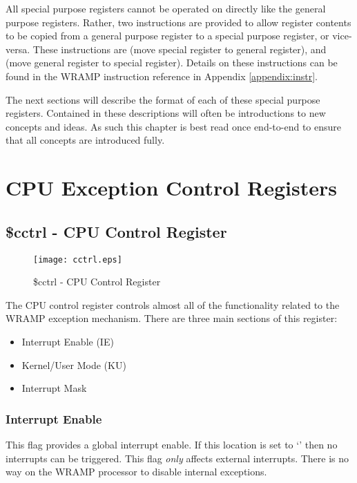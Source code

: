 All special purpose registers cannot be operated on directly like
the general purpose registers. Rather, two instructions are provided
to allow register contents to be copied from a general purpose
register to a special purpose register, or vice-versa. These
instructions are  (move special register to general
register), and  (move general register to special
register). Details on these instructions can be found in the WRAMP
instruction reference in Appendix \ref{appendix:instr}.

The next sections will describe the format of each of these special
purpose registers. Contained in these descriptions will often be
introductions to new concepts and ideas. As such this chapter is best
read once end-to-end to ensure that all concepts are introduced fully.

\section{CPU Exception Control Registers}

\subsection{\$cctrl - CPU Control Register}

\begin{figure}[h]
\begin{center}
\texttt{[image: cctrl.eps]}
\caption{\$cctrl - CPU Control Register}
\label{cctrl_pic}
\end{center}
\end{figure}

The CPU control register controls almost all of the functionality
related to the WRAMP exception mechanism. There are three main
sections of this register:

\begin{itemize}
\item Interrupt Enable (IE)
\item Kernel/User Mode (KU)
\item Interrupt Mask
\end{itemize}

\subsubsection{Interrupt Enable}

This flag provides a global interrupt enable. If this location is set
to `' then no interrupts can be triggered. This flag
\emph{only} affects external interrupts. There is no way on the WRAMP
processor to disable internal exceptions.


